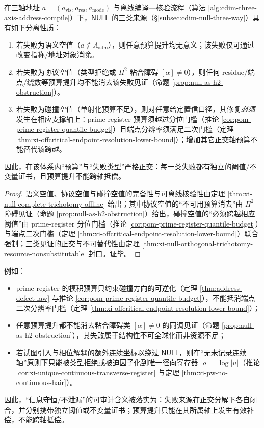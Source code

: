 \begin{theorem}\label{thm:cdim-budget-failure-separation}
在三轴地址 \(a=(a_{\mathrm{vis}},a_{\mathrm{res}},a_{\mathrm{mode}})\) 与离线编译—核验流程（算法 \ref{alg:cdim-three-axis-address-compile}）下，\(\mathsf{NULL}\) 的三类来源（\S\ref{subsec:cdim-null-three-way}）具有如下分离性质：
\begin{enumerate}
  \item 若失败为语义空值（\(a\notin A_{\mathrm{adm}}\)），则任意预算提升均无意义；该失败仅可通过改变指称/地址对象消除。
  \item 若失败为协议空值（类型拒绝或 \(H^2\) 粘合障碍 \([\alpha]\neq 0\)），则任何 residue/端点/绕数等预算提升均不能消去该失败见证（命题 \ref{prop:null-as-h2-obstruction}）。
  \item 若失败为碰撞空值（单射化预算不足），则对任意给定置信口径，其修复\emph{必须}发生在相应支撑轴上：prime-register 预算须越过分位门槛（推论 \ref{cor:pom-prime-register-quantile-budget}）且端点分辨率须满足二次门槛（定理 \ref{thm:xi-offcritical-endpoint-resolution-lower-bound}）；增加其它正交轴预算不能替代该跨越。
\end{enumerate}
因此，在该体系内“预算”与“失败类型”严格正交：每一类失败都有独立的阈值/不变量证书，且预算提升不能跨轴抵偿。
\end{theorem}
\begin{proof}
语义空值、协议空值与碰撞空值的完备性与可离线核验性由定理 \ref{thm:xi-null-complete-trichotomy-offline} 给出；其中协议空值的“不可用预算消去”由 \(H^2\) 障碍见证（命题 \ref{prop:null-as-h2-obstruction}）给出，碰撞空值的“必须跨越相应阈值”由 prime-register 分位门槛（推论 \ref{cor:pom-prime-register-quantile-budget}）与端点二次门槛（定理 \ref{thm:xi-offcritical-endpoint-resolution-lower-bound}）联合强制；三类见证的正交与不可替代性由定理 \ref{thm:xi-null-orthogonal-trichotomy-resource-nonsubstitutable} 封口。证毕。
\end{proof}
例如：
\begin{itemize}
  \item prime-register 的模积预算只约束碰撞方向的可逆化（定理 \ref{thm:address-defect-law} 与推论 \ref{cor:pom-prime-register-quantile-budget}），不能抵消端点二次分辨率门槛（定理 \ref{thm:xi-offcritical-endpoint-resolution-lower-bound}）；
  \item 任意预算提升都不能消去粘合障碍类 \([\alpha]\neq 0\) 的同调见证（命题 \ref{prop:null-as-h2-obstruction}），其失败属于结构性不可全球化而非资源不足；
  \item 若试图引入与相位解耦的额外连续坐标以绕过 \(\mathsf{NULL}\)，则在“无未记录连续轴”原则下只能被类型拒绝或被迫因子化到唯一径向寄存器 \(\varrho=\log|u|\)（推论 \ref{cor:xi-unique-continuous-transverse-register} 与定理 \ref{thm:xi-pw-no-continuous-hair}）。
\end{itemize}
因此，“信息守恒/不泄漏”的可审计含义被落实为：失败来源在正交分解下各自闭合，并分别携带独立阈值或不变量证书；预算提升只能在其所属轴上发生有效补偿，不能跨轴抵偿。

